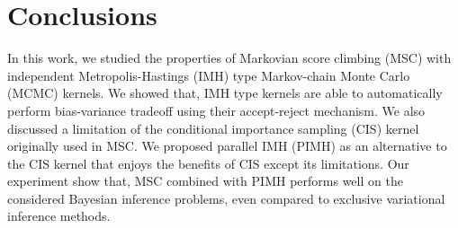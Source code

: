 
\section{Conclusions}
In this work, we studied the properties of Markovian score climbing (MSC) with independent Metropolis-Hastings (IMH) type Markov-chain Monte Carlo (MCMC) kernels.
We showed that, IMH type kernels are able to automatically perform bias-variance tradeoff using their accept-reject mechanism.
We also discussed a limitation of the conditional importance sampling (CIS) kernel originally used in MSC.
We proposed parallel IMH (PIMH) as an alternative to the CIS kernel that enjoys the benefits of CIS except its limitations.
Our experiment show that, MSC combined with PIMH performs well on the considered Bayesian inference problems, even compared to exclusive variational inference methods.


